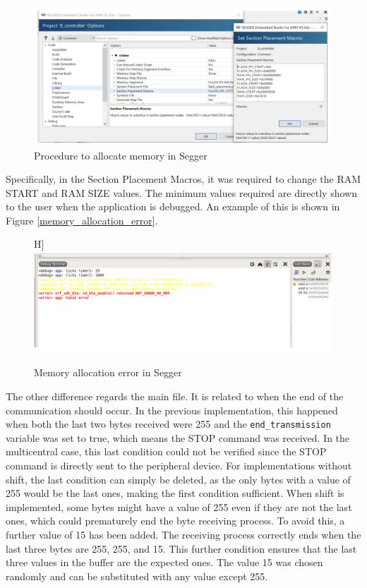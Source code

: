 \documentclass{Configuration_Files/PoliMi3i_thesis}
\begin{document}
\begin{figure}[H]
    \centering
    \includegraphics[scale=0.5]{Multicentral/3.png}
    \caption{Procedure to allocate memory in Segger}
    \label{multicentral_3}
\end{figure}

Specifically, in the Section Placement Macros, it was required to change the RAM START and RAM SIZE values. The minimum values required are directly shown to the user when the application is debugged. An example of this is shown in Figure \ref{memory_allocation_error}.

\begin{figure}H]
    \centering
    \includegraphics[scale=0.6]{Multicentral/4.png}
    \caption{Memory allocation error in Segger}
    \label{multicentral_4}
\end{figure}

The other difference regards the main file. It is related to when the end of the communication should occur. In the previous implementation, this happened when both the last two bytes received were 255 and the \texttt{end\_transmission} variable was set to true, which means the STOP command was received. In the multicentral case, this last condition could not be verified since the STOP command is directly sent to the peripheral device. For implementations without shift, the last condition can simply be deleted, as the only bytes with a value of 255 would be the last ones, making the first condition sufficient. When shift is implemented, some bytes might have a value of 255 even if they are not the last ones, which could prematurely end the byte receiving process. To avoid this, a further value of 15 has been added. The receiving process correctly ends when the last three bytes are 255, 255, and 15. This further condition ensures that the last three values in the buffer are the expected ones. The value 15 was chosen randomly and can be substituted with any value except 255.
\end{document}
